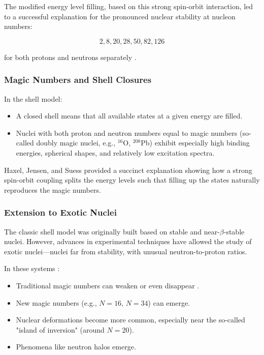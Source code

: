 The modified energy level filling, based on this strong spin-orbit interaction, led to a successful explanation for the pronounced nuclear stability at nucleon numbers:

\[2,8,20,28,50,82,126\]

for both protons and neutrons separately \cite{mayer_shell_1968}.


\subsubsection{Magic Numbers and Shell Closures}

In the shell model:

\begin{itemize}
	\item A closed shell means that all available states at a given energy are filled.
	\item Nuclei with both proton and neutron numbers equal to magic numbers (so-called doubly magic nuclei, e.g., $^{16}$O, $^{208}$Pb) exhibit especially high binding energies, spherical shapes, and relatively low excitation spectra.
\end{itemize}

Haxel, Jensen, and Suess \cite{haxel_magic_nodate} provided a succinct explanation showing how a strong spin-orbit coupling splits the energy levels such that filling up the states naturally reproduces the magic numbers.


\subsubsection{Extension to Exotic Nuclei}

The classic shell model was originally built based on stable and near-$\beta$-stable nuclei. However, advances in experimental techniques have allowed the study of exotic nuclei—nuclei far from stability, with unusual neutron-to-proton ratios.

In these systems \cite{otsuka_evolution_2020}:

\begin{itemize}
	\item Traditional magic numbers can weaken or even disappear .
	\item New magic numbers (e.g., $N=16$, $N=34$) can emerge.
	\item Nuclear deformations become more common, especially near the so-called "island of inversion" (around $N=20$).
	\item Phenomena like neutron halos emerge.
\end{itemize}

